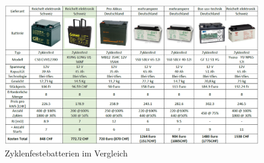 \begin{appendix}
\begin{landscape}
	\begin{figure}[H]
		\begin{center}
			\includegraphics[width=240mm]{appendix/BatterieZyklenfest.png}
			\caption[Zyklenfestebatterien]{Zyklenfestebatterien im Vergleich} %
			\label{fig:Zyklenfestebatterie}
		\end{center}
	\end{figure}
\end{landscape}



\end{appendix}
